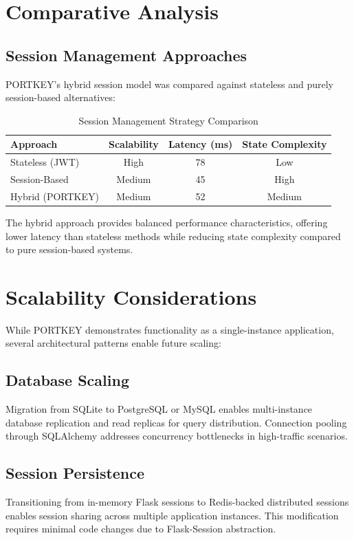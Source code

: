 \documentclass{ieeeaccess}
\begin{document}
\section{Comparative Analysis}
\label{sec:comparison}

\subsection{Session Management Approaches}
PORTKEY's hybrid session model was compared against stateless and purely session-based alternatives:

\begin{table}[H]
\centering
\caption{Session Management Strategy Comparison}
\begin{tabular}{lccc}
\toprule
\textbf{Approach} & \textbf{Scalability} & \textbf{Latency (ms)} & \textbf{State Complexity} \\
\midrule
Stateless (JWT) & High & 78 & Low \\
Session-Based & Medium & 45 & High \\
Hybrid (PORTKEY) & Medium & 52 & Medium \\
\bottomrule
\end{tabular}
\label{tab:session_comparison}
\end{table}

The hybrid approach provides balanced performance characteristics, offering lower latency than stateless methods while reducing state complexity compared to pure session-based systems.

\section{Scalability Considerations}
\label{sec:scalability}

While PORTKEY demonstrates functionality as a single-instance application, several architectural patterns enable future scaling:

\subsection{Database Scaling}
Migration from SQLite to PostgreSQL or MySQL enables multi-instance database replication and read replicas for query distribution. Connection pooling through SQLAlchemy addresses concurrency bottlenecks in high-traffic scenarios.

\subsection{Session Persistence}
Transitioning from in-memory Flask sessions to Redis-backed distributed sessions enables session sharing across multiple application instances. This modification requires minimal code changes due to Flask-Session abstraction.
\end{document}
